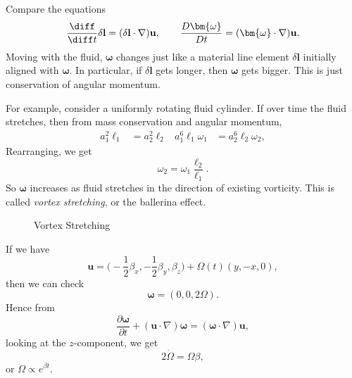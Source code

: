 \documentclass[12pt]{article}
\begin{document}
Compare the equations
\[
\frac{\diff}{\diff t} \delta \mathbf{l} = (\delta \mathbf{l} \cdot \nabla) \mathbf{u}, \qquad \frac{D \bm{\omega}}{D t} = (\bm{\omega} \cdot \nabla)\mathbf{u}
.\]
Moving with the fluid, $\bm{\omega}$ changes just like a material line element $\delta \mathbf{l}$ initially aligned with $\bm{\omega}$. In particular, if $\delta \mathbf{l}$ gets longer, then $\bm{\omega}$ gets bigger. This is just conservation of angular momentum.

For example, consider a uniformly rotating fluid cylinder. If over time the fluid stretches, then from mass conservation and angular momentum,
\begin{align*}
	a_1^2 \ell_1 &= a_2^2 \ell_2 & a_1^{6} \ell_1 \omega_1 &= a_2^{6} \ell_2 \omega_2,
\end{align*}
Rearranging, we get
\[
	\omega_2 = \omega_1 \frac{\ell_2}{\ell_1}
.\]
So $\bm{\omega}$ increases as fluid stretches in the direction of existing vorticity. This is called \emph{vortex stretching}, or the ballerina effect.

\begin{figure}[h]
	\centering
	\caption{Vortex Stretching}
	\label{fig:vortex_stretching}
\end{figure}

\begin{exbox}
	If we have
	\[
	\mathbf{u} = \biggl( - \frac{1}{2} \beta_x, - \frac{1}{2} \beta_y, \beta_z \biggr) + \Omega(t)(y, -x, 0)
	,\]
	then we can check
	\[
	\bm{\omega} = (0, 0, 2 \Omega)
	.\]
	Hence from
	\[
	\frac{\partial \bm{\omega}}{\partial t} + (\mathbf{u} \cdot \nabla) \bm{\omega} = (\bm{\omega} \cdot \nabla)\mathbf{u}
	,\]
	looking at the $z$-component, we get
	\[
	2 \dot \Omega = \Omega \beta
	,\]
	or $\Omega \propto e^{\beta t}$.
\end{exbox}
\end{document}
